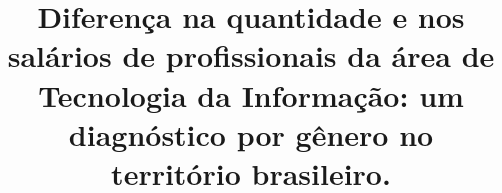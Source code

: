 \title{Diferença na quantidade e nos salários de profissionais da área de Tecnologia da Informação: um diagnóstico por gênero no território brasileiro.  \\
}
